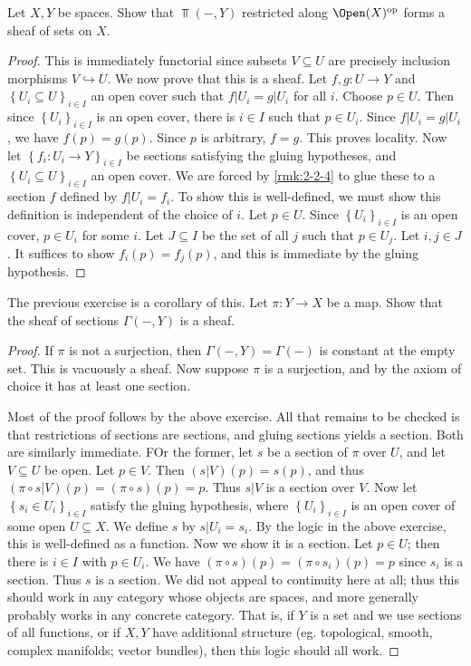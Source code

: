 \begin{exercise}
	Let $X,Y$ be spaces. Show that $\Top (-,Y)$ restricted along $\Open(X) ^{\mathrm{op}} $ forms a sheaf of sets on $X$.
\end{exercise}
\begin{proof}
	This is immediately functorial since subsets $V\subseteq U$ are precisely inclusion morphisms $V\hookrightarrow U$. We now prove that this is a sheaf. Let $f,g : U \to Y$ and $\left\{ U_i\subseteq U \right\} _{i\in I} $ an open cover such that $f|U_i=g|U_i$ for all $i$. Choose $p\in U$. Then since $\left\{ U_i \right\} _{i\in I} $ is an open cover, there is $i\in I$ such that $p\in U_i$. Since $f|U_i=g|U_i$, we have $f(p)=g(p)$. Since $p$ is arbitrary, $f=g$. This proves locality. Now let $\left\{ f_i : U_i \to Y \right\} _{i\in I} $ be sections satisfying the gluing hypotheses, and $\left\{ U_i\subseteq U \right\} _{i\in I} $ an open cover. We are forced by \cref{rmk:2-2-4} to glue these to a section $f$ defined by $f|U_i=f_i$. To show this is well-defined, we must show this definition is independent of the choice of $i$. Let $p\in U$. Since $\left\{ U_i \right\} _{i\in I} $ is an open cover, $p\in U_i$ for some $i$. Let $J\subseteq I$ be the set of all $j$ such that $p\in U_j$. Let $i,j\in J$. It suffices to show $f_i(p)=f_j(p)$, and this is immediate by the gluing hypothesis.
\end{proof}

\begin{exercise}
	The previous exercise is a corollary of this. Let $\pi : Y \to X$ be a map. Show that the sheaf of sections $\Gamma (-,Y)$ is a sheaf.
\end{exercise}
\begin{proof}
	If $\pi $ is not a surjection, then $\Gamma (-,Y)=\Gamma (-)$ is constant at the empty set. This is vacuously a sheaf. Now suppose $\pi $ is a surjection, and by the axiom of choice it has at least one section.

	Most of the proof follows by the above exercise. All that remains to be checked is that restrictions of sections are sections, and gluing sections yields a section. Both are similarly immediate. FOr the former, let $s $ be a section of $\pi $ over $U$, and let $V\subseteq U$ be open. Let $p\in V$. Then $(s |V)(p)=s (p)$, and thus $(\pi \circ s|V)(p)=(\pi \circ s )(p)=p$. Thus $s |V$ is a section over $V$. Now let $\left\{ s_i\in U_i \right\} _{i\in I} $ satisfy the gluing hypothesis, where $\left\{ U_i \right\} _{i\in I} $ is an open cover of some open $U\subseteq X$. We define $s$ by $s|U_i=s_i$. By the logic in the above exercise, this is well-defined as a function. Now we show it is a section. Let $p\in U$; then there is $i\in I$ with $p\in U_i$. We have $(\pi \circ s)(p) = (\pi \circ s_i)(p)=p$ since $s_i$ is a section. Thus $s$ is a section. We did not appeal to continuity here at all; thus this should work in any category whose objects are spaces, and more generally probably works in any concrete category. That is, if $Y$ is a set and we use sections of all functions, or if $X,Y$ have additional structure (eg. topological, smooth, complex manifolds; vector bundles), then this logic should all work.
\end{proof}

